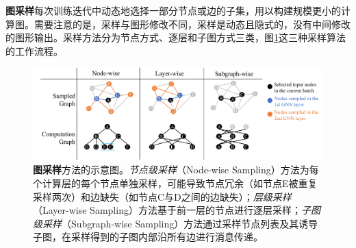 \textbf{图采样}每次训练迭代中动态地选择一部分节点或边的子集，用以构建规模更小的计算图。需要注意的是，采样与图形修改不同，采样是动态且隐式的，没有中间修改的图形输出。采样方法分为节点方式、逐层和子图方式三类，图\ref{figure:sampling}这三种采样算法的工作流程。
\begin{figure}[htbp]
    \begin{center}
    \includegraphics[width=\textwidth]{images/sampling.pdf}
    \end{center}
    \caption{\textbf{图采样}方法的示意图。\textit{节点级采样}（Node-wise Sampling）方法为每个计算层的每个节点单独采样，可能导致节点冗余（如节点E被重复采样两次）和边缺失（如节点C与D之间的边缺失）；\textit{层级采样}（Layer-wise Sampling）方法基于前一层的节点进行逐层采样；\textit{子图级采样}（Subgraph-wise Sampling）方法通过采样节点列表及其诱导子图，在采样得到的子图内部沿所有边进行消息传递。}
    \label{figure:sampling}
\end{figure}
